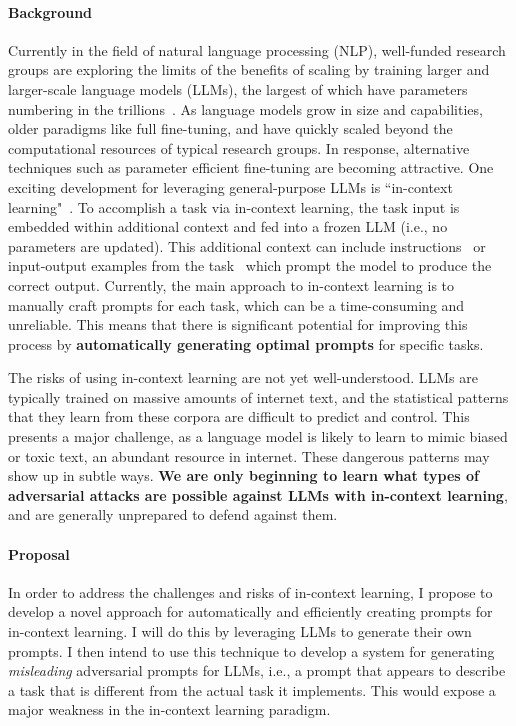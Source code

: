 \documentclass[11pt]{article}
\begin{document}
\paragraph{Background} 

Currently in the field of natural language processing (NLP), 
well-funded research groups 
are exploring the limits of the benefits of scaling 
by training larger and larger-scale language models (LLMs), 
the largest of which have parameters numbering in the trillions~\cite{Fedus2021SwitchTS}.
As language models grow in size and capabilities,
older paradigms like full fine-tuning,
and have quickly scaled beyond the computational resources 
of typical research groups.
In response, alternative techniques 
such as parameter efficient fine-tuning 
are becoming attractive.
One exciting development for leveraging general-purpose LLMs
is ``in-context learning"~\cite{Min2022RethinkingTR}. 
To accomplish a task via in-context learning,
the task input is embedded within additional context 
and fed into a frozen LLM (i.e., no parameters are updated). 
This additional context can include instructions~\cite{Wei2021FinetunedLM} 
or input-output examples from the task~\cite{Brown2020LanguageMA}
which prompt the model to produce the correct output.
Currently, the main approach to in-context learning 
is to manually craft prompts for each task,
which can be a time-consuming and unreliable.
This means that there is significant potential 
for improving this process by 
\textbf{automatically generating optimal prompts} 
for specific tasks.

The risks of using in-context learning 
are not yet well-understood.
LLMs are typically trained on massive amounts of internet text, 
and the statistical patterns that they learn from these corpora 
are difficult to predict and control.
This presents a major challenge,
as a language model is likely 
to learn to mimic biased or toxic text,
an abundant resource in internet.
These dangerous patterns may show up 
in subtle ways.
\textbf{We are only beginning to learn 
what types of adversarial attacks are possible
against LLMs with in-context learning}, 
and are generally unprepared to defend against them. 

\paragraph{Proposal}

In order to address the challenges and risks of in-context learning,
I propose to develop a novel approach 
for automatically and efficiently creating prompts for in-context learning.
I will do this by leveraging LLMs to generate their own prompts.
I then intend to use this technique 
to develop a system 
for generating \emph{misleading} adversarial prompts for LLMs, 
i.e., a prompt that appears to describe a task 
that is different from the actual task it implements.
This would expose a major weakness 
in the in-context learning paradigm.
\end{document}
